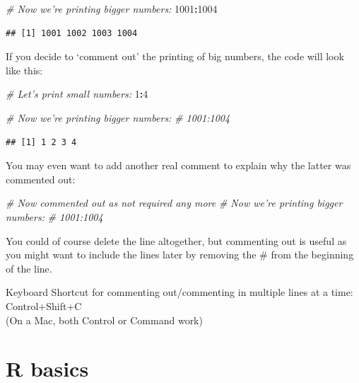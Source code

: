 \documentclass[
  12pt,
  krantz2]{krantz}
\makeatletter
\newenvironment{Shaded}{\begin{snugshade}}{\end{snugshade}}
\newcommand{\CommentTok}[1]{\textcolor[rgb]{0.56,0.35,0.01}{\textit{#1}}}
\newcommand{\DecValTok}[1]{\textcolor[rgb]{0.00,0.00,0.81}{#1}}
\newcommand{\OperatorTok}[1]{\textcolor[rgb]{0.81,0.36,0.00}{\textbf{#1}}}
\renewenvironment{quote}{\begin{VF}}{\end{VF}}
\newenvironment{kframe}{%
\medskip{}
\setlength{\fboxsep}{.8em}
 \def\at@end@of@kframe{}%
 \ifinner\ifhmode%
  \def\at@end@of@kframe{\end{minipage}}%
  \begin{minipage}{\columnwidth}%
 \fi\fi%
 \def\FrameCommand##1{\hskip\@totalleftmargin \hskip-\fboxsep
 \colorbox{shadecolor}{##1}\hskip-\fboxsep
     \hskip-\linewidth \hskip-\@totalleftmargin \hskip\columnwidth}%
 \MakeFramed {\advance\hsize-\width
   \@totalleftmargin\z@ \linewidth\hsize
   \@setminipage}}%
 {\par\unskip\endMakeFramed%
 \at@end@of@kframe}
\renewenvironment{Shaded}{\begin{kframe}}{\end{kframe}}
\makeatother
\begin{document}
\begin{Shaded}
\begin{Highlighting}[]
\CommentTok{# Now we're printing bigger numbers:}
\DecValTok{1001}\OperatorTok{:}\DecValTok{1004}
\end{Highlighting}
\end{Shaded}

\begin{verbatim}
## [1] 1001 1002 1003 1004
\end{verbatim}

If you decide to `comment out' the printing of big numbers, the code will look like this:

\begin{Shaded}
\begin{Highlighting}[]
\CommentTok{# Let's print small numbers:}
\DecValTok{1}\OperatorTok{:}\DecValTok{4}

\CommentTok{# Now we're printing bigger numbers:}
\CommentTok{# 1001:1004}
\end{Highlighting}
\end{Shaded}

\begin{verbatim}
## [1] 1 2 3 4
\end{verbatim}

You may even want to add another real comment to explain why the latter was commented out:

\begin{Shaded}
\begin{Highlighting}[]
\CommentTok{# Now commented out as not required any more}
\CommentTok{# Now we're printing bigger numbers:}
\CommentTok{# 1001:1004}
\end{Highlighting}
\end{Shaded}

You could of course delete the line altogether, but commenting out is useful as you might want to include the lines later by removing the \# from the beginning of the line.

\begin{quote}
Keyboard Shortcut for commenting out/commenting in multiple lines at a time:
Control+Shift+C\\
(On a Mac, both Control or Command work)
\end{quote}

\hypertarget{r-basics}{%
\chapter{R basics}\label{r-basics}}
\end{document}
